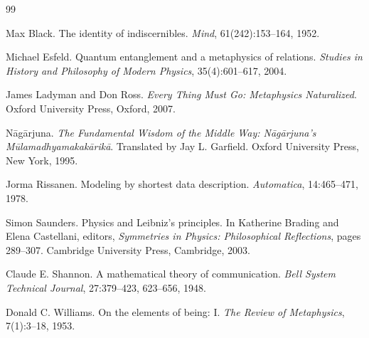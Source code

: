 \documentclass[11pt,a4paper]{article}
\theoremstyle{remark}\newtheorem{remark}[proposition]{Remark}
\begin{document}
\begin{thebibliography}{99}
\itemsep=2pt

Max Black.
\newblock The identity of indiscernibles.
\newblock \emph{Mind}, 61(242):153--164, 1952.

Michael Esfeld.
\newblock Quantum entanglement and a metaphysics of relations.
\newblock \emph{Studies in History and Philosophy of Modern Physics}, 35(4):601--617, 2004.

James Ladyman and Don Ross.
\newblock \emph{Every Thing Must Go: Metaphysics Naturalized}.
\newblock Oxford University Press, Oxford, 2007.

N\=ag\=arjuna.
\newblock \emph{The Fundamental Wisdom of the Middle Way: N\=ag\=arjuna's M\=ulamadhyamakak\=arik\=a}.
\newblock Translated by Jay L. Garfield. Oxford University Press, New York, 1995.

Jorma Rissanen.
\newblock Modeling by shortest data description.
\newblock \emph{Automatica}, 14:465--471, 1978.

Simon Saunders.
\newblock Physics and Leibniz's principles.
\newblock In Katherine Brading and Elena Castellani, editors, \emph{Symmetries in Physics:
Philosophical Reflections}, pages 289--307. Cambridge University Press, Cambridge, 2003.

Claude E. Shannon.
\newblock A mathematical theory of communication.
\newblock \emph{Bell System Technical Journal}, 27:379--423, 623--656, 1948.

Donald C. Williams.
\newblock On the elements of being: I.
\newblock \emph{The Review of Metaphysics}, 7(1):3--18, 1953.

\end{thebibliography}
\end{document}
